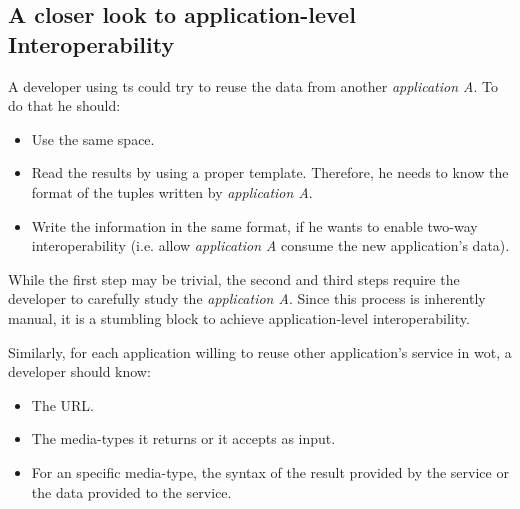 \subsection{A closer look to application-level Interoperability}
\label{sec:closer}

A developer using \ac{ts} could try to reuse the data from another \emph{application A}.
To do that he should:
\begin{itemize}
 \item Use the same space.%
 \item Read the results by using a proper template.
	Therefore, he needs to know the format of the tuples written by \emph{application A}.
 \item Write the information in the same format, if he wants to enable two-way interoperability
      (i.e. allow \emph{application A} consume the new application's data).

\end{itemize}

While the first step may be trivial, the second and third steps require the developer to carefully study the \emph{application A}.
Since this process is inherently manual, it is a stumbling block to achieve application-level interoperability.

\medskip

Similarly, for each application willing to reuse other application's service in \ac{wot}, a developer should know:
\begin{itemize}
 \item The URL.
 \item The media-types it returns or it accepts as input.
 \item For an specific media-type, the syntax of the result provided by the service or the data provided to the service. %
\end{itemize}

